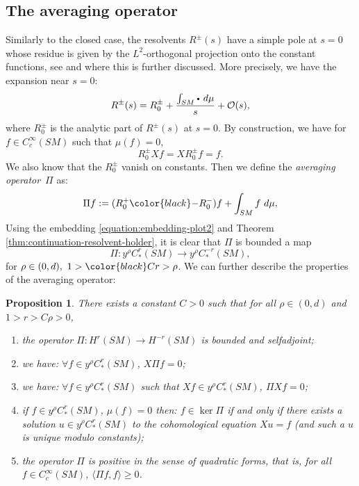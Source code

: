 \documentclass[10pt]{amsart}
\newcommand{\sbullet}{{\scriptscriptstyle\bullet}}
\newcommand{\csbullet}{{\raisebox{1pt}{$\sbullet$}}}
\newcommand{\mc}{\mathcal}
\theoremstyle{plain}
\newtheorem{proposition}{Proposition}[section]
\theoremstyle{definition}
\begin{document}
\subsection{The averaging operator}

\label{ssection:averaging}

Similarly to the closed case, the resolvents $R^\pm(s)$ have a simple pole at $s=0$ whose residue is given by the $L^2$-orthogonal projection onto the constant functions, see \cite[\S 2]{Guillarmou-17-1} and \cite[\S\S 5.1 \& 5.2]{Cekic-Lefeuvre-20} where this is further discussed. More precisely, we have the expansion near $s=0$:
\[
R^\pm(s) = R^\pm_0 + \dfrac{\int_{SM} \csbullet ~d \mu}{s} + \mc{O}(s),
\]
where $R_0^\pm$ is the analytic part of $R^\pm(s)$ at $s=0$. By construction, we have for $f\in C^\infty_c(SM)$ such that $\mu(f) = 0$,
\[
R_0^\pm X f = X R_0^\pm f = f.
\]
We also know that the $R_0^\pm$ vanish on constants. Then we define the \emph{averaging operator}~$\Pi$ as:
\begin{equation}
\label{equation:pi}
\Pi f := (R_0^+ {\color{black}-} R_0^-)f + \int_{SM} f ~d \mu,
\end{equation}
Using the embedding \eqref{equation:embedding-plot2} and Theorem \ref{thm:continuation-resolvent-holder}, it is clear that $\Pi$ is bounded a map
\begin{equation}
\label{equation:pi-bound}
\Pi : y^\rho C^r_*(SM) \to y^\rho C^{-r}_*(SM),
\end{equation}
for $\rho \in (0,d),\ 1> {\color{black}C}r > \rho$. We can further describe the properties of the averaging operator:
\begin{proposition}
\label{proposition:pi}
There exists a constant $C>0$ such that for all $\rho \in (0,d)$ and $1> r > C\rho >0$,
\begin{enumerate}
\item\label{proposition:pi1} the operator $\Pi : H^r(SM) \to H^{-r}(SM)$ is bounded and selfadjoint;
\item\label{proposition:pi2} we have: $\forall f \in y^\rho C^r_*(SM)$, $X \Pi f = 0$;
\item\label{proposition:pi3} we have: $\forall f \in y^\rho C^r_*(SM)$ such that $Xf\in y^\rho C^r_*(SM)$, $\Pi X f = 0$;
\item\label{proposition:pi4} if $f \in y^\rho C^r_*(SM)$, $\mu(f) =0$ then: $f \in \ker \Pi$ if and only if there exists a solution $u \in y^\rho C^r_*(SM)$ to the cohomological equation $X u = f$ (and such a $u$ is unique modulo constants);
\item\label{proposition:pi5} the operator $\Pi$ is positive in the sense of quadratic forms, that is, for all $f \in C^\infty_c(SM)$, $\langle \Pi f , f \rangle \geq 0$.
\end{enumerate}
\end{proposition}
\end{document}
